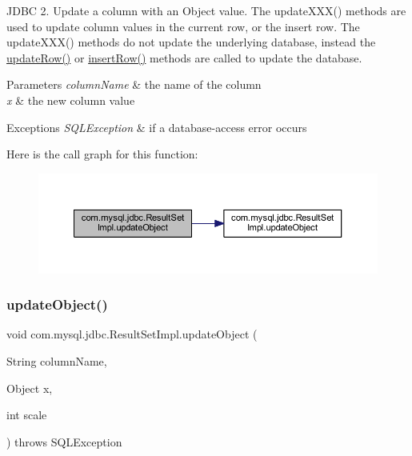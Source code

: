 J\+D\+BC 2. Update a column with an Object value. The update\+X\+X\+X() methods are used to update column values in the current row, or the insert row. The update\+X\+X\+X() methods do not update the underlying database, instead the \mbox{\hyperlink{classcom_1_1mysql_1_1jdbc_1_1_result_set_impl_a2842d32292d023aaeeafedeed3322981}{update\+Row()}} or \mbox{\hyperlink{classcom_1_1mysql_1_1jdbc_1_1_result_set_impl_a78e304e3279cbcf60392f18c1385e3bf}{insert\+Row()}} methods are called to update the database.


\begin{DoxyParams}{Parameters}
{\em column\+Name} & the name of the column \\
\hline
{\em x} & the new column value\\
\hline
\end{DoxyParams}

\begin{DoxyExceptions}{Exceptions}
{\em S\+Q\+L\+Exception} & if a database-\/access error occurs \\
\hline
\end{DoxyExceptions}
Here is the call graph for this function\+:
\nopagebreak
\begin{figure}[H]
\begin{center}
\leavevmode
\includegraphics[width=350pt]{classcom_1_1mysql_1_1jdbc_1_1_result_set_impl_a43aded796528051db3fd9cf6d372c7ba_cgraph}
\end{center}
\end{figure}
\mbox{\label{classcom_1_1mysql_1_1jdbc_1_1_result_set_impl_afe11d88b9a1ec8645a25ae1fe3e9efdf}} 
\subsubsection{\texorpdfstring{update\+Object()}{updateObject()}\hspace{0.1cm}{\footnotesize\ttfamily [4/4]}}
{\footnotesize\ttfamily void com.\+mysql.\+jdbc.\+Result\+Set\+Impl.\+update\+Object (\begin{DoxyParamCaption}\item[{String}]{column\+Name,  }\item[{Object}]{x,  }\item[{int}]{scale }\end{DoxyParamCaption}) throws S\+Q\+L\+Exception}


